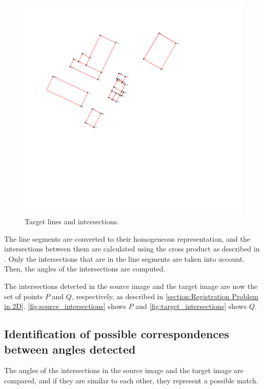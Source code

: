             \begin{figure}[H]
                \includegraphics[width=\textwidth]{images/solution_images/target_intersections_inverted.png}
                \caption{Target lines and intersections.}
                \label{fig:target_intersections}
            \end{figure}

            The line segments are converted to their homogeneous representation, 
            and the intersections between them are calculated using the cross product as described in \cite{Hartley_2003_multiple_Book}.
            Only the intersections that are in the line segments are taken into account.
            Then, the angles of the intersections are computed.

            The intersections detected in the source image and the target image are now the set of points $P$ and $Q$, respectively, 
            as described in \autoref{section:Registration Problem in 2D}. 
            \autoref{fig:source_intersections} shows $P$ and \autoref{fig:target_intersections} shows $Q$.


        \subsection{Identification of possible correspondences between angles detected}
            The angles of the intersections in the source image and the target image are compared,
            and if they are similar to each other, they represent a possible match.

